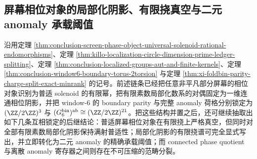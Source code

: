 \subsection{屏幕相位对象的局部化阴影、有限挠真空与二元 anomaly 承载阈值}\label{subsec:conclusion-screenphase-localized-shadow-binary-anomaly-separation}
沿用定理 \ref{thm:conclusion-screen-phase-object-universal-solenoid-rational-endomorphisms}、定理 \ref{thm:killo-localization-circle-dimension-prime-ledger-splitting}、定理 \ref{thm:conclusion-localized-groups-aut-and-finite-kernels}、定理 \ref{thm:conclusion-window6-boundary-torus-2torsion} 与定理 \ref{thm:xi-foldbin-parity-charge-split-exact-minrank} 的记号。前述链条已经把任意非平凡部分屏幕的相位对象识别为普适 solenoid 的有限幂，把有限素数局部化数系的对偶固定为一维连通相位阴影，并把 window-\(6\) 的 boundary parity 与完整 anomaly 荷格分别锁定为 \((\ZZ/2\ZZ)^3\) 与 \((G_6^{\mathrm{bin}})^{\mathrm{ab}}\cong (\ZZ/2\ZZ)^{21}\)。把这些结构并置之后，还可继续抽取出如下几条互相锁定的后继结论：普适屏幕相位对象在有限挠上严格真空，但同时对全部有限素数局部化阴影保持满射普适性；局部化阴影的有限挠谱可完全显式写出，并立即转化为二元 anomaly 的精确承载阈值；而 connected phase quotient 与离散 anomaly 寄存器之间则存在不可压缩的范畴分裂。

